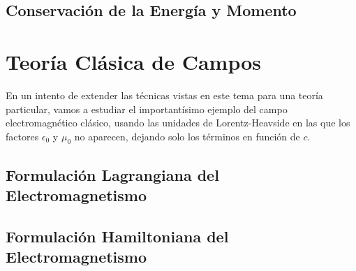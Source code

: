 \subsection{Conservación de la Energía y Momento}


\section{Teoría Clásica de Campos}

En un intento de extender las técnicas vistas en este tema para una teoría particular, vamos a estudiar el importantísimo ejemplo del campo electromagnético clásico, usando las unidades de Lorentz-Heavside en las que los factores $\epsilon_0$ y $\mu_0$ no aparecen, dejando solo los términos en función de $c$. 

\subsection{Formulación Lagrangiana del Electromagnetismo}

\subsection{Formulación Hamiltoniana del Electromagnetismo}